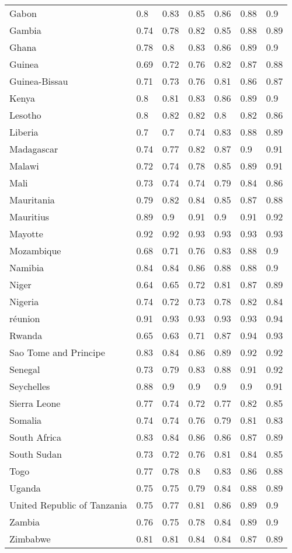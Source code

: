 \begin{longtable}[t]{lllllll}
Gabon & 0.8 & 0.83 & 0.85 & 0.86 & 0.88 & 0.9\\
Gambia & 0.74 & 0.78 & 0.82 & 0.85 & 0.88 & 0.89\\
Ghana & 0.78 & 0.8 & 0.83 & 0.86 & 0.89 & 0.9\\
\addlinespace
Guinea & 0.69 & 0.72 & 0.76 & 0.82 & 0.87 & 0.88\\
Guinea-Bissau & 0.71 & 0.73 & 0.76 & 0.81 & 0.86 & 0.87\\
Kenya & 0.8 & 0.81 & 0.83 & 0.86 & 0.89 & 0.9\\
Lesotho & 0.8 & 0.82 & 0.82 & 0.8 & 0.82 & 0.86\\
Liberia & 0.7 & 0.7 & 0.74 & 0.83 & 0.88 & 0.89\\
\addlinespace
Madagascar & 0.74 & 0.77 & 0.82 & 0.87 & 0.9 & 0.91\\
Malawi & 0.72 & 0.74 & 0.78 & 0.85 & 0.89 & 0.91\\
Mali & 0.73 & 0.74 & 0.74 & 0.79 & 0.84 & 0.86\\
Mauritania & 0.79 & 0.82 & 0.84 & 0.85 & 0.87 & 0.88\\
Mauritius & 0.89 & 0.9 & 0.91 & 0.9 & 0.91 & 0.92\\
\addlinespace
Mayotte & 0.92 & 0.92 & 0.93 & 0.93 & 0.93 & 0.93\\
Mozambique & 0.68 & 0.71 & 0.76 & 0.83 & 0.88 & 0.9\\
Namibia & 0.84 & 0.84 & 0.86 & 0.88 & 0.88 & 0.9\\
Niger & 0.64 & 0.65 & 0.72 & 0.81 & 0.87 & 0.89\\
Nigeria & 0.74 & 0.72 & 0.73 & 0.78 & 0.82 & 0.84\\
\addlinespace
réunion & 0.91 & 0.93 & 0.93 & 0.93 & 0.93 & 0.94\\
Rwanda & 0.65 & 0.63 & 0.71 & 0.87 & 0.94 & 0.93\\
Sao Tome and Principe & 0.83 & 0.84 & 0.86 & 0.89 & 0.92 & 0.92\\
Senegal & 0.73 & 0.79 & 0.83 & 0.88 & 0.91 & 0.92\\
Seychelles & 0.88 & 0.9 & 0.9 & 0.9 & 0.9 & 0.91\\
\addlinespace
Sierra Leone & 0.77 & 0.74 & 0.72 & 0.77 & 0.82 & 0.85\\
Somalia & 0.74 & 0.74 & 0.76 & 0.79 & 0.81 & 0.83\\
South Africa & 0.83 & 0.84 & 0.86 & 0.86 & 0.87 & 0.89\\
South Sudan & 0.73 & 0.72 & 0.76 & 0.81 & 0.84 & 0.85\\
Togo & 0.77 & 0.78 & 0.8 & 0.83 & 0.86 & 0.88\\
\addlinespace
Uganda & 0.75 & 0.75 & 0.79 & 0.84 & 0.88 & 0.89\\
United Republic of Tanzania & 0.75 & 0.77 & 0.81 & 0.86 & 0.89 & 0.9\\
Zambia & 0.76 & 0.75 & 0.78 & 0.84 & 0.89 & 0.9\\
Zimbabwe & 0.81 & 0.81 & 0.84 & 0.84 & 0.87 & 0.89\\*
\end{longtable}
\endgroup{}
